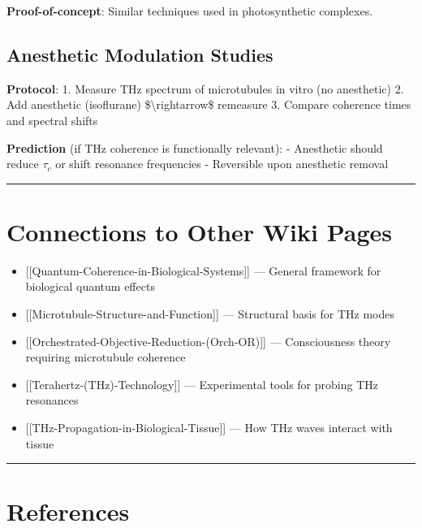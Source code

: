 \textbf{Proof-of-concept}: Similar techniques used in photosynthetic
complexes.

\subsection{Anesthetic Modulation
Studies}\label{anesthetic-modulation-studies}

\textbf{Protocol}: 1. Measure THz spectrum of microtubules in vitro (no
anesthetic) 2. Add anesthetic (isoflurane) \$\textbackslash rightarrow\$
remeasure 3. Compare coherence times and spectral shifts

\textbf{Prediction} (if THz coherence is functionally relevant): -
Anesthetic should reduce \(\tau_c\) or shift resonance frequencies -
Reversible upon anesthetic removal

\begin{center}\rule{0.5\linewidth}{0.5pt}\end{center}

\section{Connections to Other Wiki
Pages}\label{connections-to-other-wiki-pages}

\begin{itemize}
\tightlist
\item
  {[}{[}Quantum-Coherence-in-Biological-Systems{]}{]} --- General
  framework for biological quantum effects
\item
  {[}{[}Microtubule-Structure-and-Function{]}{]} --- Structural
  basis for THz modes
\item
  {[}{[}Orchestrated-Objective-Reduction-(Orch-OR){]}{]} ---
  Consciousness theory requiring microtubule coherence
\item
  {[}{[}Terahertz-(THz)-Technology{]}{]} --- Experimental tools for
  probing THz resonances
\item
  {[}{[}THz-Propagation-in-Biological-Tissue{]}{]} --- How THz waves
  interact with tissue
\end{itemize}

\begin{center}\rule{0.5\linewidth}{0.5pt}\end{center}

\section{References}\label{references}

